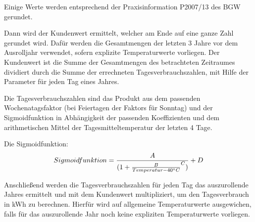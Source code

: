 Einige Werte werden entsprechend der Praxisinformation P2007/13 des BGW \cite{bgwvkup200713} gerundet.

Dann wird der Kundenwert ermittelt, welcher am Ende auf eine ganze Zahl gerundet wird. Dafür werden die Gesamtmengen der letzten 3 Jahre vor dem Ausrolljahr verwendet, sofern explizite Temperaturwerte vorliegen. Der Kundenwert ist die Summe der Gesamtmengen des betrachteten Zeitraumes dividiert durch die Summe der errechneten Tagesverbrauchszahlen, mit Hilfe der Parameter für jeden Tag eines Jahres.

Die Tagesverbrauchszahlen sind das Produkt aus dem passenden Wochenatagsfaktor (bei Feiertagen der Faktors für Sonntag) und der Sigmoidfunktion in Abhängigkeit der passenden Koeffizienten und dem arithmetischen Mittel der Tagesmitteltemperatur der letzten 4 Tage.

Die Sigmoidfunktion:
\begin{equation*}
Sigmoidfunktion = \frac{A}{(1 + \frac{B}{Temperatur-40^\circ C}^C)} + D
\end{equation*}

Anschließend werden die Tagesverbrauchszahlen für jeden Tag das auszurollende Jahres ermittelt und mit dem Kundenwert multipliziert, um den Tagesverbrauch in kWh zu berechnen. Hierfür wird auf allgemeine Temperaturwerte ausgewichen, falls für das auszurollende Jahr noch keine expliziten Temperaturwerte vorliegen.
